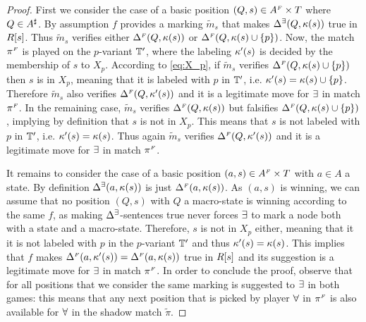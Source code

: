 \begin{proof}
First we consider the case of a basic position $(Q,s) \in A^{{\scriptscriptstyle F}} \times T$ where $Q \in A^{\sharp}$. By assumption $f$ provides a marking $\widetilde{m}_s$ that makes $\Delta^\exists(Q,\kappa(s))$ true in $R[s]$. Thus $\widetilde{m}_s$ verifies either $\Delta^{{\scriptscriptstyle F}}(Q,\kappa(s))$ or $\Delta^{{\scriptscriptstyle F}}(Q,\kappa(s)\cup \{p\})$. Now, the match $\pi^{{\scriptscriptstyle F}}$ is played on the $p$-variant $\mathbb{T}'$, where the labeling $\kappa'(s)$ is decided by the membership of $s$ to $X_p$. According to \eqref{eq:X_p}, if $\widetilde{m}_s$ verifies $\Delta^{{\scriptscriptstyle F}}(Q,\kappa(s)\cup \{p\})$ then $s$ is in $X_p$, meaning that it is labeled with $p$ in $\mathbb{T}'$, i.e. $\kappa'(s) = \kappa(s)\cup \{p\}$. Therefore $\widetilde{m}_s$ also verifies $\Delta^{{\scriptscriptstyle F}}(Q,\kappa'(s))$ and it is a legitimate move for $\exists$ in match $\pi^{{\scriptscriptstyle F}}$. In the remaining case, $\widetilde{m}_s$ verifies $\Delta^{{\scriptscriptstyle F}}(Q,\kappa(s))$ but falsifies $\Delta^{{\scriptscriptstyle F}}(Q,\kappa(s)\cup \{p\})$, implying by definition that $s$ is not in $X_p$. This means that $s$ is not labeled with $p$ in $\mathbb{T}'$, i.e. $\kappa'(s) = \kappa(s)$. Thus again $\widetilde{m}_s$ verifies $\Delta^{{\scriptscriptstyle F}}(Q,\kappa'(s))$ and it is a legitimate move for $\exists$ in match $\pi^{{\scriptscriptstyle F}}$.

It remains to consider the case of a basic position $(a,s) \in A^{{\scriptscriptstyle F}} \times T$ with $a \in A$ a state. By definition $\Delta^\exists(a,\kappa(s))$ is just $\Delta^{{\scriptscriptstyle F}}(a,\kappa(s))$. As $(a,s)$ is winning, we can assume that no position $(Q,s)$ with $Q$ a macro-state is winning according to the same $f$, as making $\Delta^\exists$-sentences true never forces $\exists$ to mark a node both with a state and a macro-state. Therefore, $s$ is not in $X_p$ either, meaning that it it is not labeled with $p$ in the $p$-variant $\mathbb{T}'$ and thus $\kappa'(s) = \kappa(s)$. This implies that $f$ makes $\Delta^{{\scriptscriptstyle F}}(a,\kappa'(s)) = \Delta^{{\scriptscriptstyle F}}(a,\kappa(s))$ true in $R[s]$ and its suggestion is a legitimate move for $\exists$ in match $\pi^{{\scriptscriptstyle F}}$. In order to conclude the proof, observe that for all positions that we consider the same marking is suggested to $\exists$ in both games: this means that any next position that is picked by player $\forall$ in $\pi^{{\scriptscriptstyle F}}$ is also available for $\forall$ in the shadow match $\tilde{\pi}$.



\end{proof}
